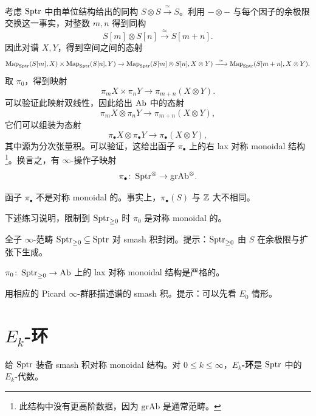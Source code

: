 \begin{construction}\label{L27-2.3}
考虑 $\operatorname{Sptr}$ 中由单位结构给出的同构 $S\otimes S\xrightarrow{\ \simeq\ }S$。利用 $-\otimes-$ 与每个因子的余极限交换这一事实，对整数 $m,n$ 得到同构
\[
S[m]\otimes S[n]\xrightarrow{\ \simeq\ }S[m+n].
\]
因此对谱 $X,Y$，得到空间之间的态射
\[
\operatorname{Map}_{\operatorname{Sptr}}(S[m],X)\times\operatorname{Map}_{\operatorname{Sptr}}(S[n],Y)\to\operatorname{Map}_{\operatorname{Sptr}}(S[m]\otimes S[n],X\otimes Y)
\xrightarrow{\ \simeq\ }\operatorname{Map}_{\operatorname{Sptr}}(S[m+n],X\otimes Y).
\]
取 $\pi_{0}$，得到映射
\[
\pi_{m}X\times\pi_{n}Y\to\pi_{m+n}(X\otimes Y).
\]
可以验证此映射双线性，因此给出 $\operatorname{Ab}$ 中的态射
\[
\pi_{m}X\otimes\pi_{n}Y\to\pi_{m+n}(X\otimes Y),
\]
它们可以组装为态射
\[
\pi_{\bullet}X\otimes\pi_{\bullet}Y\to\pi_{\bullet}(X\otimes Y),
\]
其中源为分次张量积。可以验证，这给出函子 $\pi_{\bullet}$ 上的右 lax 对称 monoidal 结构\footnote{此结构中没有更高阶数据，因为 $\mathrm{grAb}$ 是通常范畴。}。换言之，有 $\infty$-操作子映射
\[
\pi_{\bullet}\colon\operatorname{Sptr}^{\otimes}\to\mathrm{grAb}^{\otimes}.
\]
\end{construction}

\begin{warning}\label{L27-2.4}
函子 $\pi_{\bullet}$ 不是对称 monoidal 的。事实上，$\pi_{\bullet}(S)$ 与 $\mathbb{Z}$ 大不相同。
\end{warning}

\nitem\label{L27-2.5}
下述练习说明，限制到 $\operatorname{Sptr}_{\ge 0}$ 时 $\pi_{0}$ 是对称 monoidal 的。

\begin{exercise}\label{L27-2.6}
全子 $\infty$-范畴 $\operatorname{Sptr}_{\ge 0}\subseteq\operatorname{Sptr}$ 对 smash 积封闭。提示：$\operatorname{Sptr}_{\ge 0}$ 由 $S$ 在余极限与扩张下生成。
\end{exercise}

\begin{exercise}\label{L27-2.7}
$\pi_{0}\colon\operatorname{Sptr}_{\ge 0}\to\operatorname{Ab}$ 上的 lax 对称 monoidal 结构是严格的。
\end{exercise}

\begin{exercise}\label{L27-2.8}
用相应的 Picard $\infty$-群胚描述谱的 smash 积。提示：可以先看 $E_{0}$ 情形。
\end{exercise}

\section{$E_{k}$-环}

\begin{definition}\label{L27-3.1}
给 $\operatorname{Sptr}$ 装备 smash 积对称 monoidal 结构。对 $0\le k\le\infty$，\textbf{$E_{k}$-环}是 $\operatorname{Sptr}$ 中的 $E_{k}$-代数。
\end{definition}

